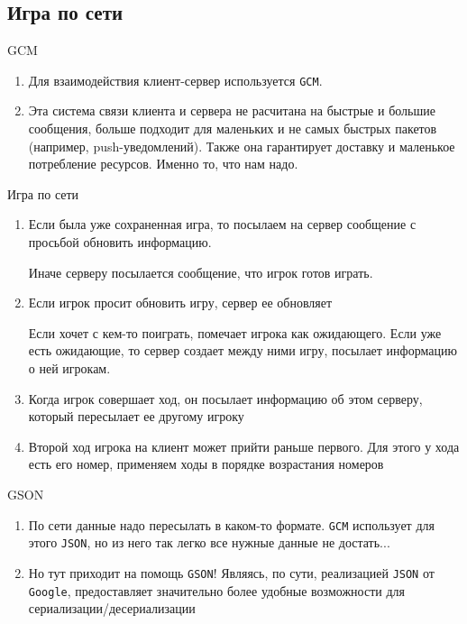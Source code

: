 \documentclass{beamer}
\def\t{\texttt}
\newcommand{\cimg}[2]{%
    \begin{center}%
        \ifthenelse{\equal{#2}{}}{%
            \texttt{[image: \#1]}
        }{%
            \texttt{[image: \#1]}
        }%
    \end{center}%
}
\begin{document}
\subsection{Игра по сети}
\begin{frame}[t]{GCM}
    \begin{enumerate}
        \item
            Для взаимодействия клиент-сервер используется \t{GCM}.
                        
        \item
			Эта система связи клиента и сервера не расчитана на быстрые и большие сообщения, больше подходит для маленьких и не самых быстрых пакетов (например, push-уведомлений). Также она гарантирует доставку и маленькое потребление ресурсов. Именно то, что нам надо.
    \end{enumerate}
\end{frame}
\begin{frame}[t]{Игра по сети}
    \begin{enumerate}
        \item
            Если была уже сохраненная игра, то посылаем на сервер сообщение с просьбой обновить информацию.
                
            Иначе серверу посылается сообщение, что игрок готов играть.
        \pause
        \item
            Если игрок просит обновить игру, сервер ее обновляет

            Если хочет с кем-то поиграть, помечает игрока как ожидающего. Если уже есть ожидающие, то сервер создает между ними игру, посылает информацию о ней игрокам.
        \pause
        \item
            Когда игрок совершает ход, он посылает информацию об этом серверу, который пересылает ее другому игроку
        \pause
        \item
            Второй ход игрока на клиент может прийти раньше первого. Для этого у хода есть его номер, применяем ходы в порядке возрастания номеров
    \end{enumerate}
\end{frame}
\begin{frame}[t]{GSON}
    \begin{enumerate}
        \item
            По сети данные надо пересылать в каком-то формате. \t{GCM} использует для этого \t{JSON}, но из него так легко все нужные данные не достать...
            \cimg{02.png}{1.0}
        \pause
        \item
            Но тут приходит на помощь \t{GSON}! Являясь, по сути, реализацией \t{JSON} от \t{Google}, %
            предоставляет значительно более удобные возможности для сериализации/десериализации
            \cimg{03.png}{1.0}

    \end{enumerate}
\end{frame}
\end{document}
